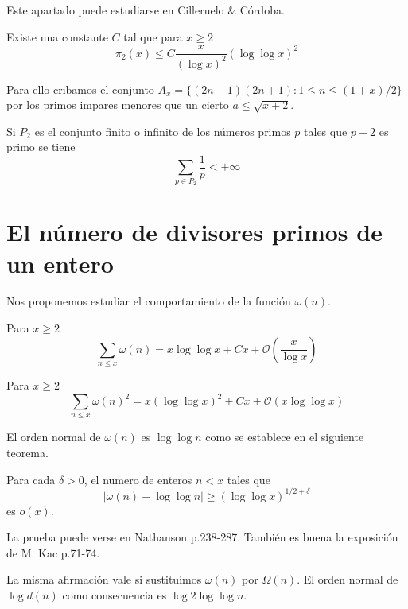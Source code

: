 \documentclass[TAN.tex]{subfiles}
\begin{document}
Este apartado puede estudiarse en Cilleruelo \& Córdoba.

\begin{teorema}
Existe una constante $C$ tal que para $x ≥ 2$
\[ π_2(x) ≤ C \frac{x}{(\log x)^2} (\log \log x)^2 \]
\end{teorema}
Para ello cribamos el conjunto $A_x = \{(2n-1)(2n+1) : 1 ≤ n ≤ (1+x)/2\}$
por los primos impares menores que un cierto $a ≤ \sqrt{x+2}$.

\begin{coro}
Si $P_2$ es el conjunto finito o infinito de los números primos $p$ tales que $p+2$ es primo se tiene
\[ \sum_{p\in P_2} \frac{1}{p} < +∞ \]
\end{coro}

\section{El número de divisores primos de un entero}
Nos proponemos estudiar el comportamiento de la función $ω(n)$.
\begin{teorema}
Para $x ≥ 2$
\[ \sum_{n≤x} ω(n) = x\log \log x + Cx + \mathcal{O}\left(\frac{x}{\log x}\right) \]
\end{teorema}
\begin{teorema}
Para $x ≥ 2$
\[ \sum_{n≤x} ω(n)^2 = x(\log \log x)^2 + Cx + \mathcal{O}(x \log \log x) \]
\end{teorema}
El orden normal de $ω(n)$ es $\log \log n$ como se establece en el siguiente teorema.
\begin{teorema}
Para cada $δ > 0$, el numero de enteros $n < x$ tales que
\[ |ω(n) - \log \log n| ≥ (\log \log x)^{1/2+δ} \]
es $ο(x)$.

La prueba puede verse en Nathanson p.238-287. También es buena la exposición de M. Kac p.71-74.

La misma afirmación vale si sustituimos $ω(n)$ por $Ω(n)$. El orden normal de $\log d(n)$ como consecuencia es $\log 2 \log \log n$.
\end{teorema}
\end{document}
